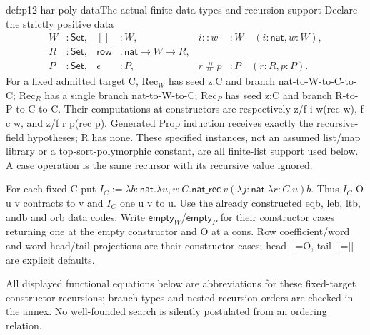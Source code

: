 \begin{hbdefinition}{def:p12-har-poly-data}{The actual finite data types and recursion support}
Declare the strictly positive data
\[
\begin{aligned}
 W&:\mathsf{Set},& []&:W,&i::w&:W\quad(i:\mathsf{nat},w:W),\\
 R&:\mathsf{Set},&\mathsf{row}&:\mathsf{nat}\to W\to R,\\
 P&:\mathsf{Set},&\epsilon&:P,&r\mathbin{\#}p&:P\quad(r:R,p:P).
\end{aligned}
\]
For a fixed admitted target C, \(\mathrm{Rec}_W\) has seed z:C and branch
nat-to-W-to-C-to-C; \(\mathrm{Rec}_R\) has a single branch nat-to-W-to-C;
\(\mathrm{Rec}_P\) has seed z:C and branch R-to-P-to-C-to-C. Their computations
at constructors are respectively z/f i w(rec w), f c w, and
z/f r p(rec p). Generated Prop induction receives exactly the
recursive-field hypotheses; R has none. These specified instances,
not an assumed list/map library or a top-sort-polymorphic constant,
are all finite-list support used below. A case operation is the same
recursor with its recursive value ignored.

For each fixed C put
\(I_C:=\lambda b:\mathsf{nat}.\lambda u,v:C.
\mathsf{nat\_rec}\ v(\lambda j:\mathsf{nat}.\lambda r:C.u)b\).
Thus \(I_C\) O u v contracts to v and \(I_C\) one u v to u.
Use the already constructed eqb, leb, ltb, andb and orb data codes.
Write \(\mathsf{empty}_W\)/\(\mathsf{empty}_P\) for their constructor cases returning one at
the empty constructor and O at a cons. Row coefficient/word and
word head/tail projections are their constructor cases; head []=O,
tail []=[] are explicit defaults.

All displayed functional equations below are abbreviations for these
fixed-target constructor recursions; branch types and nested recursion
orders are checked in the annex. No well-founded search is silently
postulated from an ordering relation.
\end{hbdefinition}

